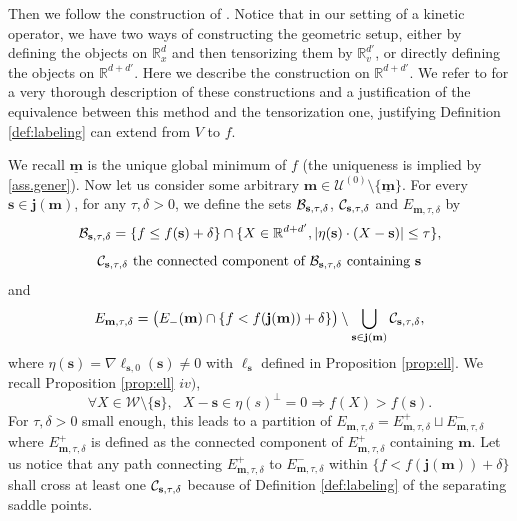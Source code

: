 \documentclass[12pt]{amsart}
\newcommand{\R}{\mathbb R}
\numberwithin{equation}{section}
\numberwithin{figure}{section}
\def\m{\mathbf{m}}
\def\s{\mathbf{s}}
\def\j{\mathbf{j}}
\def\um{\underline{\m}}
\def\uuu{{\mathcal U}}\def\vvv{{\mathcal V}}\def\www{{\mathcal W}}\def\xxx{{\mathcal X}}
\begin{document}
Then we follow the construction of \cite[Section 4]{BoLePMi22}. Notice that in our setting of a kinetic operator, we have two ways of constructing the geometric setup, either by defining the objects on $\R^d_x$ and then tensorizing them by $\R^{d'}_v$, or directly defining the objects on $\R^{d+d'}$. Here we describe the construction on $\R^{d+d'}$. We refer to \cite[Section 3.1]{No23} for a very thorough description of these constructions and a justification of the equivalence between this method and the tensorization one, justifying Definition \ref{def:labeling} can extend from $V$ to $f$.

We recall $\um$ is the unique global minimum of $f$ (the uniqueness is implied by \eqref{ass.gener}). Now let us consider some arbitrary $\m\in\uuu^{(0)}\setminus\{\um\}$. For every $\s\in\j(\m)$, for any $\tau,\delta>0$, we define the sets $\bbb_{\s,\tau,\delta}$, $\ccc_{\s,\tau,\delta}$ and $E_{\m,\tau,\delta}$ by
\begin{equation*}
\bbb_{\s,\tau,\delta} = \{f\leq f(\s)+\delta\}\cap\{X\in\R^{d+d'},|\eta(\s)\cdot(X - \s)|\leq\tau\},
\end{equation*}
\begin{equation}\label{eq:ccc}
\ccc_{\s,\tau,\delta} \mbox{ the connected component of } \bbb_{\s,\tau,\delta} \mbox{ containing } \s
\end{equation}
and
\begin{equation*}
E_{\m,\tau,\delta} = \big(E_-(\m)\cap\{f<f(\j(\m))+\delta\}\big)\setminus\bigcup_{\s\in\j(\m)}\ccc_{\s,\tau,\delta},
\end{equation*}
where $\eta(\s) = \nabla\ell_{\s,0}(\s)\neq0$ with $\ell_{\s}$ defined in Proposition \ref{prop:ell}. We recall Proposition \ref{prop:ell} $iv)$,
\begin{equation*}
\forall X\in\www\setminus\{\s\},\ \ \ X-\s\in\eta(s)^\bot = 0 \Rightarrow f(X) > f(\s).
\end{equation*}
For $\tau,\delta>0$ small enough, this leads to a partition of $E_{\m,\tau,\delta} = E^+_{\m,\tau,\delta}\sqcup E^-_{\m,\tau,\delta}$ where $E^+_{\m,\tau,\delta}$ is defined as the connected component of $E^+_{\m,\tau,\delta}$ containing $\m$. Let us notice that any path connecting $E^+_{\m,\tau,\delta}$ to $E^-_{\m,\tau,\delta}$ within $\{f<f(\j(\m))+\delta\}$ shall cross at least one $\ccc_{\s,\tau,\delta}$ because of Definition \ref{def:labeling} of the separating saddle points.
\end{document}

